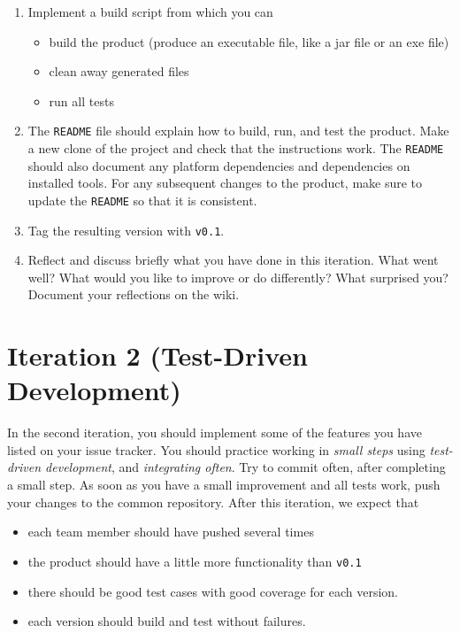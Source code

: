 \documentclass[swedish,english]{article}
\begin{document}
\begin{enumerate}
\item Implement a build script from which you can
\begin{itemize}
  \item build the product (produce an executable file, like a jar file or an exe file)
  \item clean away generated files
  \item run all tests
\end{itemize}

\item The \verb'README' file should explain how to build, run, and test the product. Make a new clone of the project and check that the instructions work. The \verb'README' should also document any platform dependencies and dependencies on installed tools. For any subsequent changes to the product, make sure to update the \verb'README' so that it is consistent.

\item Tag the resulting version with \verb'v0.1'.

\item Reflect and discuss briefly what you have done in this iteration. What went well? What would you like to improve or do differently? What surprised you? Document your reflections on the wiki.
\end{enumerate}

\section*{Iteration 2 (Test-Driven Development)}
In the second iteration, you should implement some of the features you have listed on your issue tracker. You should practice working in \emph{small steps} using \emph{test-driven development}, and \emph{integrating often}. Try to commit often, after completing a small step. As soon as you have a small improvement and all tests work, push your changes to the common repository. After this iteration, we expect that
\begin{itemize}
\item each team member should have pushed several times
\item the product should have a little more functionality than \verb'v0.1'
\item there should be good test cases with good coverage for each version.
\item each version should build and test without failures.
\end{itemize}
\end{document}
